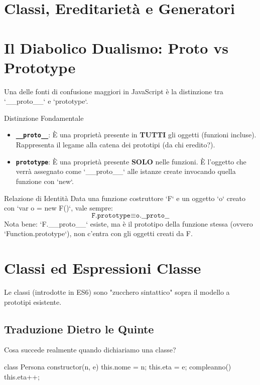 \section{Classi, Ereditarietà e Generatori}

\section{Il Diabolico Dualismo: Proto vs Prototype}
Una delle fonti di confusione maggiori in JavaScript è la distinzione tra `__proto__` e `prototype`.

\begin{definition}{Distinzione Fondamentale}
    \begin{itemize}
        \item \textbf{\texttt{\_\_proto\_\_}}: È una proprietà presente in \textbf{TUTTI} gli oggetti (funzioni incluse). Rappresenta il legame alla catena dei prototipi (da chi eredito?).
        \item \textbf{\texttt{prototype}}: È una proprietà presente \textbf{SOLO} nelle funzioni. È l'oggetto che verrà assegnato come `__proto__` alle istanze create invocando quella funzione con `new`.
    \end{itemize}
\end{definition}

\begin{concept}{Relazione di Identità}
Data una funzione costruttore `F` e un oggetto `o` creato con `var o = new F()`, vale sempre:
$$ \texttt{F.prototype} \equiv \texttt{o.\_\_proto\_\_} $$
Nota bene: `F.__proto__` esiste, ma è il prototipo della funzione stessa (ovvero `Function.prototype`), non c'entra con gli oggetti creati da F.
\end{concept}

\section{Classi ed Espressioni Classe}
Le classi (introdotte in ES6) sono "zucchero sintattico" sopra il modello a prototipi esistente.

\subsection{Traduzione Dietro le Quinte}
Cosa succede realmente quando dichiariamo una classe?

\begin{jsbox}[title={Classe ES6}]
class Persona {
    constructor(n, e) {
        this.nome = n;
        this.eta = e;
    }
    compleanno() { this.eta++; }
}
\end{jsbox}

